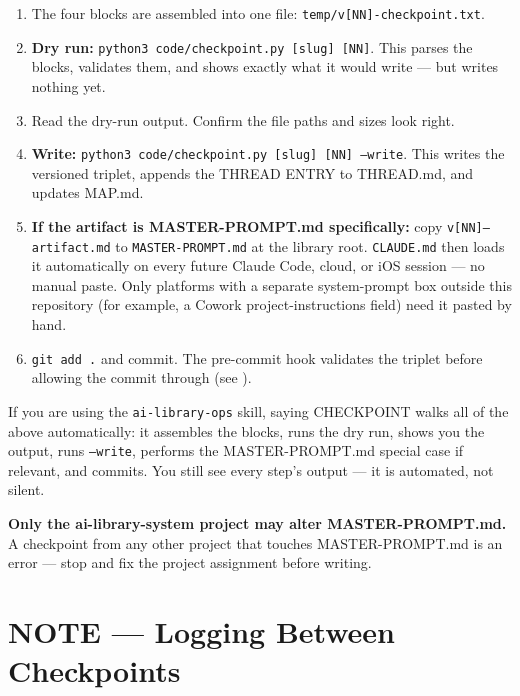 \documentclass[12pt,letterpaper]{article}
\begin{document}
\begin{mdframed}[style=stepbox]
\begin{enumerate}
\item The four blocks are assembled into one file:
      \texttt{temp/v[NN]-checkpoint.txt}.
\item \textbf{Dry run:} \texttt{python3 code/checkpoint.py [slug] [NN]}.
      This parses the blocks, validates them, and shows exactly what it
      would write --- but writes nothing yet.
\item Read the dry-run output. Confirm the file paths and sizes look
      right.
\item \textbf{Write:} \texttt{python3 code/checkpoint.py [slug] [NN]
      --write}. This writes the versioned triplet, appends the THREAD
      ENTRY to THREAD.md, and updates MAP.md.
\item \textbf{If the artifact is MASTER-PROMPT.md specifically:} copy
      \texttt{v[NN]--artifact.md} to \texttt{MASTER-PROMPT.md} at the
      library root. \texttt{CLAUDE.md} then loads it automatically on
      every future Claude Code, cloud, or iOS session --- no manual
      paste. Only platforms with a separate system-prompt box outside
      this repository (for example, a Cowork project-instructions field)
      need it pasted by hand.
\item \texttt{git add .} and commit. The pre-commit hook validates the
      triplet before allowing the commit through (see
      ).
\end{enumerate}
\end{mdframed}

If you are using the \texttt{ai-library-ops} skill, saying CHECKPOINT
walks all of the above automatically: it assembles the blocks, runs the
dry run, shows you the output, runs \texttt{--write}, performs the
MASTER-PROMPT.md special case if relevant, and commits. You still see
every step's output --- it is automated, not silent.

\begin{mdframed}[style=warnbox]
\textbf{Only the ai-library-system project may alter MASTER-PROMPT.md.}
A checkpoint from any other project that touches MASTER-PROMPT.md is an
error --- stop and fix the project assignment before writing.
\end{mdframed}

\section{NOTE --- Logging Between Checkpoints}
\end{document}
